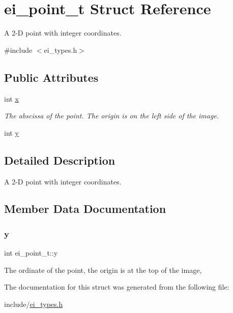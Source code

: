 \hypertarget{structei__point__t}{}\section{ei\+\_\+point\+\_\+t Struct Reference}
\label{structei__point__t}


A 2-\/D point with integer coordinates.  




{\ttfamily \#include $<$ei\+\_\+types.\+h$>$}

\subsection*{Public Attributes}
\begin{DoxyCompactItemize}
\item 
\mbox{\label{structei__point__t_a6ec4a8846bae4b9694506dae039047b3}} 
int \hyperlink{structei__point__t_a6ec4a8846bae4b9694506dae039047b3}{x}
\begin{DoxyCompactList}\small\item\em The abscissa of the point. The origin is on the left side of the image. \end{DoxyCompactList}\item 
int \hyperlink{structei__point__t_a0c0f1bfa95c372595c52522877f556a0}{y}
\end{DoxyCompactItemize}


\subsection{Detailed Description}
A 2-\/D point with integer coordinates. 

\subsection{Member Data Documentation}
\mbox{\label{structei__point__t_a0c0f1bfa95c372595c52522877f556a0}} 
\subsubsection{\texorpdfstring{y}{y}}
{\footnotesize\ttfamily int ei\+\_\+point\+\_\+t\+::y}

The ordinate of the point, the origin is at the top of the image, 

The documentation for this struct was generated from the following file\+:\begin{DoxyCompactItemize}
\item 
include/\hyperlink{ei__types_8h}{ei\+\_\+types.\+h}\end{DoxyCompactItemize}
